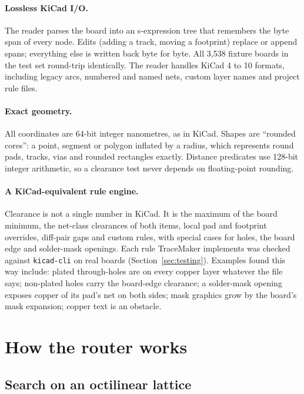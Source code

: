 \documentclass[10pt,a4paper]{article}
\begin{document}
\paragraph{Lossless KiCad I/O.} The reader parses the board into an s-expression tree that remembers the byte span
of every node. Edits (adding a track, moving a footprint) replace or append spans; everything else is written back
byte for byte. All 3,538 fixture boards in the test set round-trip identically. The reader handles KiCad 4 to 10
formats, including legacy arcs, numbered and named nets, custom layer names and project rule files.

\paragraph{Exact geometry.} All coordinates are 64-bit integer nanometres, as in KiCad. Shapes are ``rounded
cores'': a point, segment or polygon inflated by a radius, which represents round pads, tracks, vias and rounded
rectangles exactly. Distance predicates use 128-bit integer arithmetic, so a clearance test never depends on
floating-point rounding.

\paragraph{A KiCad-equivalent rule engine.} Clearance is not a single number in KiCad. It is the maximum of the
board minimum, the net-class clearances of both items, local pad and footprint overrides, diff-pair gaps and
custom rules, with special cases for holes, the board edge and solder-mask openings. Each rule TraceMaker
implements was checked against \texttt{kicad-cli} on real boards (Section~\ref{sec:testing}). Examples found this
way include: plated through-holes are on every copper layer whatever the file says; non-plated holes carry the
board-edge clearance; a solder-mask opening exposes copper of its pad's net on both sides; mask graphics grow by
the board's mask expansion; copper text is an obstacle.

\section{How the router works}

\subsection{Search on an octilinear lattice}
\end{document}
